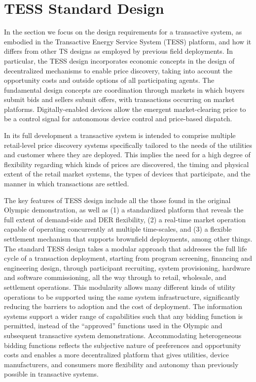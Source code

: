 \section{TESS Standard Design}\label{sec:standard_design}

In the section we focus on the design requirements for a transactive system, as embodied in the Transactive Energy Service System (TESS) platform, and how it differs from other TS designs as employed by previous field deployments. In particular, the TESS design incorporates economic concepts in the design of decentralized mechanisms to enable price discovery, taking into account the opportunity costs and outside options of all participating agents. The fundamental design concepts are coordination through markets in which buyers submit bids and sellers submit offers, with transactions occurring on market platforms. Digitally-enabled devices allow the emergent market-clearing price to be a control signal for autonomous device control and price-based dispatch. 

In its full development a transactive system is intended to comprise multiple retail-level price discovery systems specifically tailored to the needs of the utilities and customer where they are deployed.  This implies the need for a high degree of flexibility regarding which kinds of prices are discovered, the timing and physical extent of the retail market systems, the types of devices that participate, and the manner in which transactions are settled.

The key features of TESS design include all the those found in the original Olympic demonstration, as well as (1) a standardized platform that reveals the full extent of demand-side and DER flexibility, (2) a real-time market operation capable of operating concurrently at multiple time-scales, and (3) a flexible settlement mechanism that supports brownfield deployments, among other things. The standard TESS design takes a modular approach that addresses the full life cycle of a transaction deployment, starting from program screening, financing and engineering design, through participant recruiting, system provisioning, hardware and software commissioning, all the way through to retail, wholesale, and settlement operations. This modularity allows many different kinds of utility operations to be supported using the same system infrastructure, significantly reducing the barriers to adoption and the cost of deployment.  The information systems support a wider range of capabilities such that any  bidding function is permitted, instead of the ``approved'' functions used in the Olympic and subsequent transactive system demonstrations. Accommodating heterogeneous bidding functions reflects the subjective nature of preferences and opportunity costs and enables a more decentralized platform that gives utilities, device manufacturers, and consumers more flexibility and autonomy than previously possible in transactive systems.

